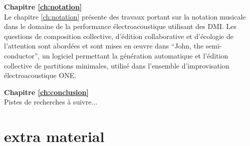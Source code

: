 \textbf{Chapitre \ref{ch:notation}} \\[0.2em]
Le chapitre \ref{ch:notation} présente des travaux portant sur la notation musicale dans le domaine de la performance électroacoustique utilisant des DMI. Les questions de composition collective, d'édition collaborative et d'écologie de l'attention sont abordées et sont mises en œuvre dans ``John, the semi-conductor'', un logiciel permettant la génération automatique et l'édition collective de partitions minimales, utilisé dans l'ensemble d'improvisation électroacoustique ONE. 

\textbf{Chapitre \ref{ch:conclusion}} \\[0.2em]
Pistes de recherches à suivre...


\section*{extra material}
